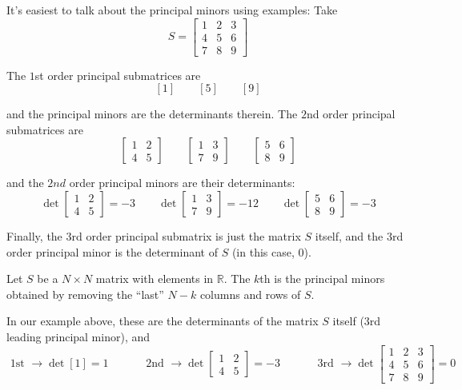 \documentclass{article}
\begin{document}
It's easiest to talk about the principal minors using examples: Take
\[
  S = \left[\begin{matrix}
    1 & 2 & 3 \\
    4 & 5 & 6 \\
    7 & 8 & 9
  \end{matrix}\right]
\]

The $1$st order principal submatrices are
\[
  [1]
  \quad\quad
  [5]
  \quad\quad
  [9]
\]

and the principal minors are the determinants therein. The $2$nd order principal submatrices are
\[
  \left[\begin{matrix}
    1 & 2 \\
    4 & 5
  \end{matrix}\right]
  \quad\quad
  \left[\begin{matrix}
    1 & 3 \\
    7 & 9
  \end{matrix}\right]
  \quad\quad
  \left[\begin{matrix}
    5 & 6 \\
    8 & 9
  \end{matrix}\right]
\]

and the $2nd$ order principal minors are their  determinants:
\[
  \det\left[\begin{matrix}
    1 & 2 \\
    4 & 5
  \end{matrix}\right]
  = -3
  \quad\quad
  \det\left[\begin{matrix}
    1 & 3 \\
    7 & 9
  \end{matrix}\right]
  = -12
  \quad\quad
  \det\left[\begin{matrix}
    5 & 6 \\
    8 & 9
  \end{matrix}\right]
  =
  -3
\]

Finally, the $3$rd order principal submatrix is just the matrix $S$ itself, and the $3$rd order principal minor is the determinant of $S$ (in this case, $0$).

\begin{definition}
  Let $S$ be a $N \times N$ matrix with elements in $\mathbb{R}$. The $k$th  is the principal minors obtained by removing the ``last'' $N - k$ columns and rows of $S$.
\end{definition}

In our example above, these are the determinants of the matrix $S$ itself ($3$rd leading principal minor), and
\[
  \text{ 1st }
  \rightarrow
  \det[1]
  =
  1
  \quad\quad\quad
  \text{ 2nd }
  \rightarrow
  \det\left[\begin{matrix}
    1 & 2 \\
    4 & 5
  \end{matrix}\right]
  =
  - 3
  \quad\quad\quad
  \text{ 3rd }
  \rightarrow
  \det\left[\begin{matrix}
    1 & 2 & 3 \\
    4 & 5 & 6 \\
    7 & 8 & 9
  \end{matrix}\right]
  =
  0
\]
\end{document}
